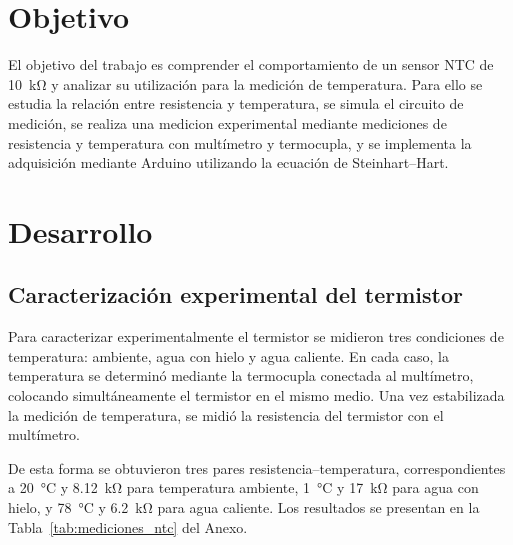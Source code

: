 \documentclass[10pt]{article}
\begin{document}
\thispagestyle{fancy}

\newpage
\tableofcontents
\thispagestyle{fancy}

\newpage


\section{Objetivo}

El objetivo del trabajo es comprender el comportamiento de un sensor NTC de
\SI{10}{\kilo\ohm} y analizar su utilización para la medición de temperatura.
Para ello se estudia la relación entre resistencia y temperatura, se simula el
circuito de medición, se realiza una medicion experimental mediante
mediciones de resistencia y temperatura con multímetro y termocupla, y se implementa la adquisición mediante Arduino utilizando
la ecuación de Steinhart--Hart.

\section{Desarrollo}

\subsection{Caracterización experimental del termistor}

Para caracterizar experimentalmente el termistor se midieron tres condiciones de
temperatura: ambiente, agua con hielo y agua caliente. En cada caso, la temperatura
se determinó mediante la termocupla conectada al multímetro, colocando simultáneamente
el termistor en el mismo medio. Una vez estabilizada la medición de temperatura, se
midió la resistencia del termistor con el multímetro.

\vspace{0.3cm}

De esta forma se obtuvieron tres pares resistencia--temperatura, correspondientes a
\SI{20}{\celsius} y \SI{8.12}{\kilo\ohm} para temperatura ambiente,
\SI{1}{\celsius} y \SI{17}{\kilo\ohm} para agua con hielo, y
\SI{78}{\celsius} y \SI{6.2}{\kilo\ohm} para agua caliente. Los resultados se
presentan en la Tabla~\ref{tab:mediciones_ntc} del Anexo.
\end{document}
